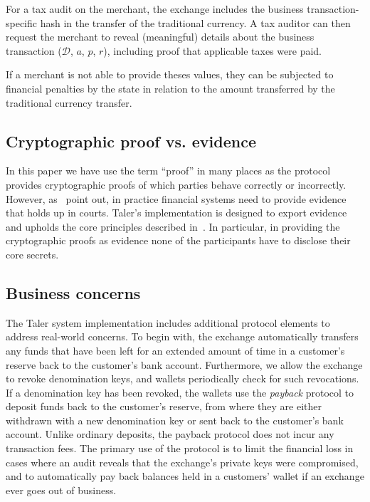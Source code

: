 \documentclass[sigconf, authordraft]{acmart}
\begin{document}
For a tax audit on the merchant, the exchange includes the business
transaction-specific hash in the transfer of the traditional
currency.  A tax auditor can then request the merchant to reveal
(meaningful) details about the business transaction ($\mathcal{D}$,
$a$, $p$, $r$), including proof that applicable taxes were paid.

If a merchant is not able to provide theses values, they can be
subjected to financial penalties by the state in relation to the
amount transferred by the traditional currency transfer.

\subsection{Cryptographic proof vs. evidence}

In this paper we have use the term ``proof'' in many places as the
protocol provides cryptographic proofs of which parties behave
correctly or incorrectly. However, as~\cite{fc2014murdoch} point out,
in practice financial systems need to provide evidence that holds up
in courts.  Taler's implementation is designed to export evidence and
upholds the core principles described in~\cite{fc2014murdoch}.  In
particular, in providing the cryptographic proofs as evidence none of
the participants have to disclose their core secrets.

\subsection{Business concerns}

The Taler system implementation includes additional protocol elements
to address real-world concerns.  To begin with, the exchange
automatically transfers any funds that have been left for an extended
amount of time in a customer's reserve back to the customer's bank
account.  Furthermore, we allow the exchange to revoke denomination
keys, and wallets periodically check for such revocations.  If a
denomination key has been revoked, the wallets use the {\em payback}
protocol to deposit funds back to the customer's reserve, from where
they are either withdrawn with a new denomination key or sent back to
the customer's bank account.  Unlike ordinary deposits, the payback
protocol does not incur any transaction fees. The primary use of the
protocol is to limit the financial loss in cases where an audit
reveals that the exchange's private keys were compromised, and to
automatically pay back balances held in a customers' wallet if an
exchange ever goes out of business.
\end{document}
